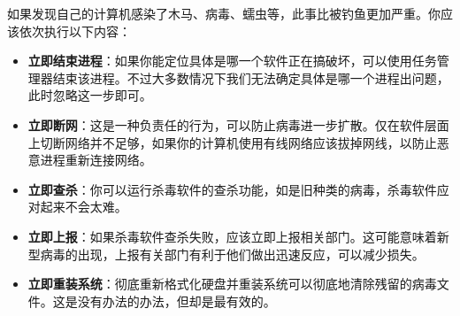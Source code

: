 \documentclass[../main.tex]{subfiles}
\begin{document}
如果发现自己的计算机感染了木马、病毒、蠕虫等，此事比被钓鱼更加严重。你应该依次执行以下内容：

\begin{itemize}
  \item \textbf{立即结束进程}：如果你能定位具体是哪一个软件正在搞破坏，可以使用任务管理器结束该进程。不过大多数情况下我们无法确定具体是哪一个进程出问题，此时忽略这一步即可。
  \item \textbf{立即断网}：这是一种负责任的行为，可以防止病毒进一步扩散。仅在软件层面上切断网络并不足够，如果你的计算机使用有线网络应该拔掉网线，以防止恶意进程重新连接网络。
  \item \textbf{立即查杀}：你可以运行杀毒软件的查杀功能，如是旧种类的病毒，杀毒软件应对起来不会太难。
  \item \textbf{立即上报}：如果杀毒软件查杀失败，应该立即上报相关部门。这可能意味着新型病毒的出现，上报有关部门有利于他们做出迅速反应，可以减少损失。
  \item \textbf{立即重装系统}：彻底重新格式化硬盘并重装系统可以彻底地清除残留的病毒文件。这是没有办法的办法，但却是最有效的。
\end{itemize}
\end{document}
